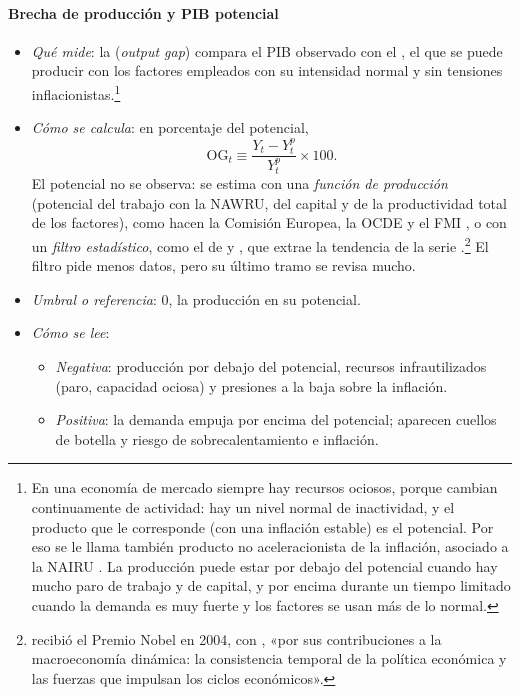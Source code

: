 \documentclass[11pt]{article}
\begin{document}
\paragraph{Brecha de producción y PIB potencial}
\begin{itemize}
\item \emph{Qué mide}: la  (\emph{output gap}) compara el PIB observado con el , el que se puede producir con los factores empleados con su intensidad normal y sin tensiones inflacionistas.\footnote{En una economía de mercado siempre hay recursos ociosos, porque cambian continuamente de actividad: hay un nivel normal de inactividad, y el producto que le corresponde (con una inflación estable) es el potencial. Por eso se le llama también producto no aceleracionista de la inflación, asociado a la NAIRU . La producción puede estar por debajo del potencial cuando hay mucho paro de trabajo y de capital, y por encima durante un tiempo limitado cuando la demanda es muy fuerte y los factores se usan más de lo normal.}
\item \emph{Cómo se calcula}: en porcentaje del potencial,
\[
\mathrm{OG}_t\equiv\frac{Y_t-Y^p_t}{Y^p_t}\times100 .
\]
El potencial no se observa: se estima con una \emph{función de producción} (potencial del trabajo con la NAWRU, del capital y de la productividad total de los factores), como hacen la Comisión Europea, la OCDE y el FMI \parencite{Havik2014Potencial} , o con un \emph{filtro estadístico}, como el de  y , que extrae la tendencia de la serie \parencite{HodrickPrescott1997} .\footnote{ recibió el Premio Nobel en 2004, con , «por sus contribuciones a la macroeconomía dinámica: la consistencia temporal de la política económica y las fuerzas que impulsan los ciclos económicos»\nocite{Nobel2004KydlandPrescott}.} El filtro pide menos datos, pero su último tramo se revisa mucho.
\item \emph{Umbral o referencia}: 0, la producción en su potencial.
\item \emph{Cómo se lee}:
  \begin{itemize}
  \item \emph{Negativa}: producción por debajo del potencial, recursos infrautilizados (paro, capacidad ociosa) y presiones a la baja sobre la inflación.
  \item \emph{Positiva}: la demanda empuja por encima del potencial; aparecen cuellos de botella y riesgo de sobrecalentamiento e inflación.

\end{itemize}
\end{itemize}
\end{document}
